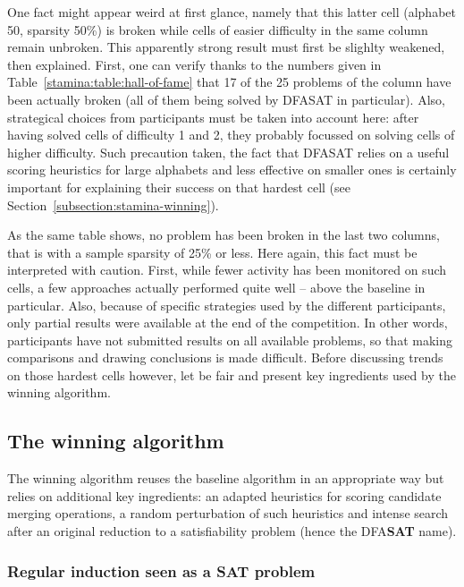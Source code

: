 One fact might appear weird at first glance, namely that this latter cell (alphabet 50, sparsity 50\%) is broken while cells of easier difficulty in the same column remain unbroken. This apparently strong result must first be slighlty weakened, then explained. First, one can verify thanks to the numbers given in Table~\ref{stamina:table:hall-of-fame} that 17 of the 25 problems of the column have been actually broken (all of them being solved by DFASAT in particular). Also, strategical choices from participants must be taken into account here: after having solved cells of difficulty 1 and 2, they probably focussed on solving cells of higher difficulty. Such precaution taken, the fact that DFASAT relies on a useful scoring heuristics for large alphabets and less effective on smaller ones is certainly important for explaining their success on that hardest cell (see Section~\ref{subsection:stamina-winning}).

As the same table shows, no problem has been broken in the last two columns, that is with a sample sparsity of 25\% or less. Here again, this fact must be interpreted with caution. First, while fewer activity has been monitored on such cells, a few approaches actually performed quite well -- above the baseline in particular. Also, because of specific strategies used by the different participants, only partial results were available at the end of the competition. In other words, participants have not submitted results on all available problems, so that making comparisons and drawing conclusions is made difficult. Before discussing trends on those hardest cells however, let be fair and present key ingredients used by the winning algorithm.

\subsection{The winning algorithm\label{subsection:stamina-winning}}

The winning algorithm reuses the baseline algorithm in an appropriate way but relies on additional key ingredients: an adapted heuristics for scoring candidate merging operations, a random perturbation of such heuristics and intense search after an original reduction to a satisfiability problem (hence the DFA\textbf{SAT} name).

\subsubsection*{Regular induction seen as a SAT problem}

